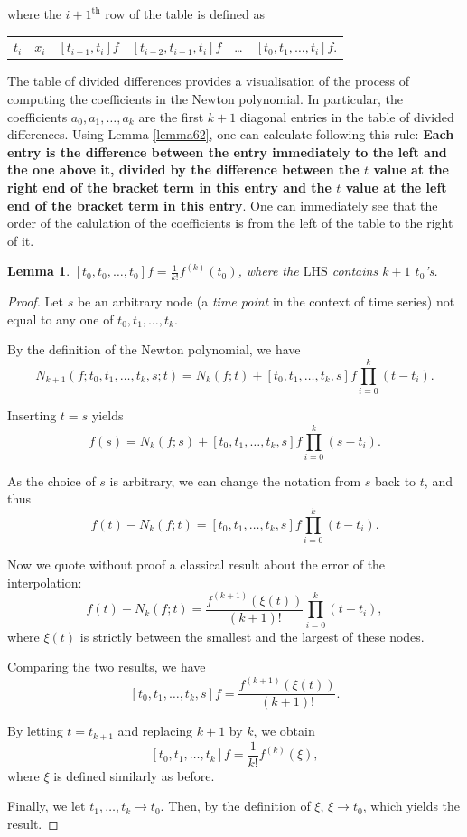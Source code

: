 \documentclass[a4paper,11pt,titlepage]{article}
\theoremstyle{definition}
\theoremstyle{plain}
\newtheorem{lemma}[theorem]{Lemma}
\theoremstyle{remark}
\begin{document}
where the $i+1^{\mathrm{th}}$ row of the table is defined as 

\begin{center}
\begin{tabular}{ c c c c c c }
$t_i$ & $x_i$ & $[t_{i-1},t_i]f$ & $[t_{i-2},t_{i-1},t_i]f$ & \dots & $[t_0,t_1,\dots,t_i]f.$
\end{tabular}
\end{center}

The table of divided differences provides a visualisation of the process of computing the coefficients in the Newton polynomial. In particular, the coefficients $a_0,a_1,\dots,a_k$ are the first $k+1$ diagonal entries in the table of divided differences. Using Lemma \ref{lemma62}, one can calculate following this rule: \textbf{Each entry is the difference between the entry immediately to the left and the one above it, divided by the difference between the $t$ value at the right end of the bracket term in this entry and the $t$ value at the left end of the bracket term in this entry}. One can immediately see that the order of the calulation of the coefficients is from the left of the table to the right of it.

\begin{lemma}\label{lemma63}
    $[t_0,t_0,\dots,t_0]f=\frac{1}{k!}f^{(k)}(t_0)$, where the $\mathrm{LHS}$ contains $k+1$ $t_0$'s.
\end{lemma}
\begin{proof}
    Let $s$ be an arbitrary node (a \textit{time point} in the context of time series) not equal to any one of $t_0,t_1,\dots,t_k$.
    
    By the definition of the Newton polynomial, we have
    $$N_{k+1}(f;t_0,t_1,\dots,t_k,s;t)=N_k(f;t)+[t_0,t_1,\dots,t_k,s]f\prod_{i=0}^k(t-t_i).$$
    
    Inserting $t=s$ yields
    $$f(s)=N_k(f;s)+[t_0,t_1,\dots,t_k,s]f\prod_{i=0}^k(s-t_i).$$

    As the choice of $s$ is arbitrary, we can change the notation from $s$ back to $t$, and thus
    $$f(t)-N_k(f;t)=[t_0,t_1,\dots,t_k,s]f\prod_{i=0}^k(t-t_i).$$

    Now we quote without proof a classical result about the error of the interpolation:
    $$f(t)-N_k(f;t)=\frac{f^{(k+1)}(\xi(t))}{(k+1)!}\prod_{i=0}^k(t-t_i),$$
    where $\xi(t)$ is strictly between the smallest and the largest of these nodes.

    Comparing the two results, we have
    $$[t_0,t_1,\dots,t_k,s]f=\frac{f^{(k+1)}(\xi(t))}{(k+1)!}.$$
    
    By letting $t=t_{k+1}$ and replacing $k+1$ by $k$, we obtain
    $$[t_0,t_1,\dots,t_k]f=\frac{1}{k!}f^{(k)}(\xi),$$
    where $\xi$ is defined similarly as before.

    Finally, we let $t_1,\dots,t_k\rightarrow t_0$. Then, by the definition of $\xi$, $\xi\rightarrow t_0$, which yields the result.
\end{proof}
\end{document}

